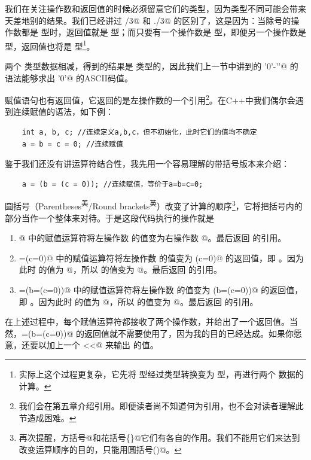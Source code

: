 我们在关注操作数和返回值的时候必须留意它们的类型，因为类型不同可能会带来天差地别的结果。我们已经讲过 /3@ 和 ./3@ 的区别了，这是因为：当除号的操作数都是 \lstinline@int@ 型时，返回值就是 \lstinline@int@ 型；而只要有一个操作数是 \lstinline@double@ 型，即便另一个操作数是 \lstinline@int@ 型，返回值也将是 \lstinline@double@ 型\footnote{实际上这个过程更复杂，它先将 \lstinline@int@ 型经过类型转换变为 \lstinline@double@ 型，再进行两个 \lstinline@double@ 数据的计算。}。\par
两个 \lstinline@char@ 类型数据相减，得到的结果是 \lstinline@int@ 类型的，因此我们上一节中讲到的 \lstinline@'0'-'\0'@ 的语法能够求出 \lstinline@'0'@ 的ASCII码值。\par
赋值语句也有返回值，它返回的是左操作数的一个引用\footnote{我们会在第五章介绍引用。即便读者尚不知道何为引用，也不会对读者理解此节造成困难。}。在C++中我们偶尔会遇到连续赋值的语法，如下例：
\begin{lstlisting}
    int a, b, c; //连续定义a,b,c，但不初始化，此时它们的值均不确定
    a = b = c = 0; //连续赋值
\end{lstlisting}
鉴于我们还没有讲运算符结合性，我先用一个容易理解的带括号版本来介绍：
\begin{lstlisting}
    a = (b = (c = 0)); //连续赋值，等价于a=b=c=0;
\end{lstlisting}
圆括号（Parentheses\textsuperscript{美}/Round brackets\textsuperscript{英}）改变了计算的顺序\footnote{再次提醒，方括号\lstinline@[]@和花括号\lstinline@\{\}@它们有各自的作用。我们不能用它们来达到改变运算顺序的目的，只能用圆括号\lstinline@()@。}，它将把括号内的部分当作一个整体来对待。于是这段代码执行的操作就是
\begin{enumerate}
    \item {}@ 中的赋值运算符将左操作数 \lstinline@c@ 的值变为右操作数 @。最后返回 \lstinline@c@ 的引用。
    \item \lstinline@b=(c=0)@ 中的赋值运算符将左操作数 \lstinline@b@ 的值变为 \lstinline@(c=0)@ 的返回值，即 \lstinline@c@ 。因为此时 \lstinline@c@ 的值为 @，所以 \lstinline@b@ 的值变为 @。最后返回 \lstinline@b@ 的引用。
    \item \lstinline@a=(b=(c=0))@ 中的赋值运算符将左操作数 \lstinline@a@ 的值变为 \lstinline@(b=(c=0))@ 的返回值，即 \lstinline@b@。因为此时 \lstinline@b@ 的值为 @，所以 \lstinline@a@ 的值变为 @。最后返回 \lstinline@a@ 的引用。
\end{enumerate}
在上述过程中，每个赋值运算符都接收了两个操作数，并给出了一个返回值。当然，\lstinline@a=(b=(c=0))@ 的返回值就不需要使用了，因为我的目的已经达成。如果你愿意，还要以加上一个 \lstinline@cout<<@ 来输出 \lstinline@a@ 的值。
